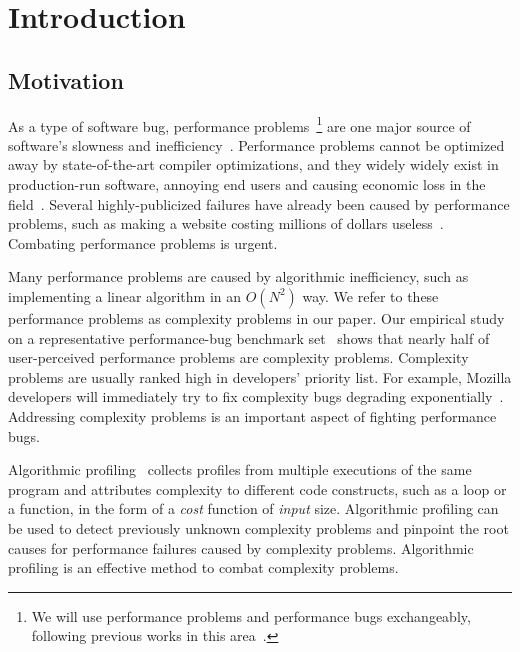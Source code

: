 \section{Introduction}
\label{sec:intro}

\subsection{Motivation}
\label{sec:motiv}

As a type of software bug, performance problems~\footnote{We will use performance problems and performance bugs exchangeably,
following previous works in this area~\cite{SongOOPSLA2014,ldoctor}.}
are one major source of software's slowness and inefficiency~\cite{PerfBug,perf.fse10,SongOOPSLA2014,ldoctor,Alabama}. 
Performance problems cannot be optimized away by state-of-the-art compiler optimizations, 
and they widely widely exist in production-run software,
annoying end users and causing economic loss in the field~\cite{PerfBug,SongOOPSLA2014,ldoctor}. 
Several highly-publicized failures have already been caused by performance problems,
such as making a website costing millions of dollars useless~\cite{ACA-health}.
Combating performance problems is urgent.


Many performance problems are caused by algorithmic inefficiency,
such as implementing a linear algorithm in an $O(N^2)$ way.
We refer to these performance problems as complexity problems in our paper.
Our empirical study on a representative performance-bug
benchmark set~\cite{PerfBug,SongOOPSLA2014} shows that
nearly half of user-perceived performance problems are complexity problems.
Complexity problems are usually ranked high in developers' priority list.
For example, Mozilla developers will immediately try to fix 
complexity bugs degrading exponentially~\cite{mozilla35294}.
Addressing complexity problems is an important aspect of fighting performance bugs.

Algorithmic profiling~\cite{Aprof1,Aprof2,AlgoProf} collects profiles from multiple
executions of the same program and attributes complexity to different code constructs, such as a loop or a function,
in the form of a \textit{cost} function of \textit{input} size.
Algorithmic profiling can be used to detect previously unknown complexity problems and
pinpoint the root causes for performance failures caused by complexity problems.
Algorithmic profiling is an effective method to combat complexity problems. 



